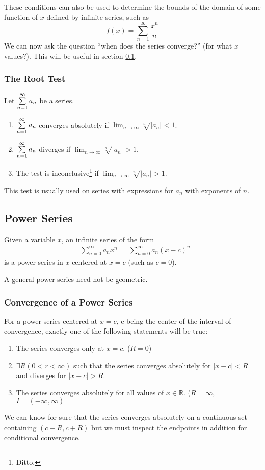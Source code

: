 \documentclass{article}
\begin{document}
These conditions can also be used to determine the bounds of the domain of some function of $x$ defined by infinite series, such as $$f(x) = \sum_{n=1}^{\infty} \frac{x^n}{n}$$
We can now ask the question ``when does the series converge?'' (for what $x$ values?). This will be useful in section \ref{power-series}.

\subsubsection{The Root Test}
Let $\sum_{n=1}^{\infty}\limits a_n$ be a series.
\begin{enumerate}
    \item $\sum_{n=1}^{\infty}\limits a_n$ converges absolutely if $\lim_{n\to\infty} \sqrt[n]{|a_n|} < 1$.
    \item $\sum_{n=1}^{\infty}\limits a_n$ diverges if $\lim_{n\to\infty} \sqrt[n]{|a_n|} > 1$.
    \item The test is inconclusive\footnote{Ditto.} if $\lim_{n\to\infty} \sqrt[n]{|a_n|} > 1$.
\end{enumerate}
This test is usually used on series with expressions for $a_n$ with exponents of $n$.

\subsection{Power Series}\label{power-series}
Given a variable $x$, an infinite series of the form
\begin{align*}
    &\sum_{n=0}^{\infty}a_nx^n & &\sum_{n=0}^{\infty}a_n\left(x-c\right)^n
\end{align*}
is a power series in $x$ centered at $x=c$ (such as $c=0$).

A general power series need not be geometric.

\subsubsection{Convergence of a Power Series}
For a power series centered at $x=c$, c being the center of the interval of convergence, exactly one of the following statements will be true:
\begin{enumerate}
    \item The series converges only at $x=c$. ($R = 0$)
    \item $\exists R \left(0 < r < \infty\right)$ such that the series converges absolutely for $|x-c|<R$ and diverges for $|x-c| > R$.
    \item The series converges absolutely for all values of $x\in\mathbb{R}$. ($R = \infty$, $I=(-\infty,\infty)$
\end{enumerate}
We can know for sure that the series converges absolutely on a continuous set containing $(c-R, c+R)$ but we must inspect the endpoints in addition for conditional convergence.
\end{document}
